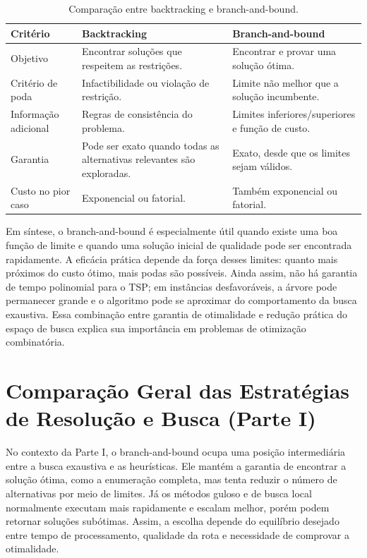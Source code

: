 \begin{table}[htb]
\centering
\caption{Comparação entre backtracking e branch-and-bound.}
\label{tab:bnb-backtracking}
\small
\renewcommand{\arraystretch}{1.3}
\begin{tabular}{|>{\raggedright\arraybackslash}p{3.4cm}|>{\raggedright\arraybackslash}p{5.1cm}|>{\raggedright\arraybackslash}p{5.1cm}|}
\hline
\rowcolor{gray!20}
\textbf{Critério} & \textbf{Backtracking} & \textbf{Branch-and-bound} \\ \hline
Objetivo & Encontrar soluções que respeitem as restrições. & Encontrar e provar uma solução ótima. \\ \hline
Critério de poda & Infactibilidade ou violação de restrição. & Limite não melhor que a solução incumbente. \\ \hline
Informação adicional & Regras de consistência do problema. & Limites inferiores/superiores e função de custo. \\ \hline
Garantia & Pode ser exato quando todas as alternativas relevantes são exploradas. & Exato, desde que os limites sejam válidos. \\ \hline
Custo no pior caso & Exponencial ou fatorial. & Também exponencial ou fatorial. \\ \hline
\end{tabular}
\end{table}

Em síntese, o branch-and-bound é especialmente útil quando existe uma boa função de limite e quando uma solução inicial de qualidade pode ser encontrada rapidamente. A eficácia prática depende da força desses limites: quanto mais próximos do custo ótimo, mais podas são possíveis. Ainda assim, não há garantia de tempo polinomial para o TSP; em instâncias desfavoráveis, a árvore pode permanecer grande e o algoritmo pode se aproximar do comportamento da busca exaustiva. Essa combinação entre garantia de otimalidade e redução prática do espaço de busca explica sua importância em problemas de otimização combinatória.

\section{Comparação Geral das Estratégias de Resolução e Busca (Parte I)}

No contexto da Parte I, o branch-and-bound ocupa uma posição intermediária entre a busca exaustiva e as heurísticas. Ele mantém a garantia de encontrar a solução ótima, como a enumeração completa, mas tenta reduzir o número de alternativas por meio de limites. Já os métodos guloso e de busca local normalmente executam mais rapidamente e escalam melhor, porém podem retornar soluções subótimas. Assim, a escolha depende do equilíbrio desejado entre tempo de processamento, qualidade da rota e necessidade de comprovar a otimalidade.
